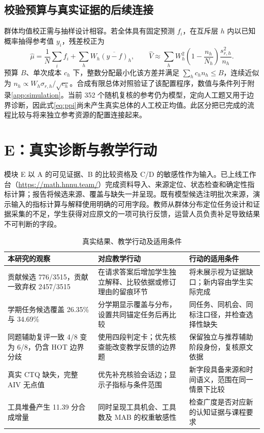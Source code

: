 \documentclass[withoutpreface,bwprint]{cumcmthesis}
\begin{document}
\subsection{校验预算与真实证据的后续连接}
群体均值校正需与抽样设计相容。若全体具有固定预测 $f_i$，在互斥层 $h$ 内以已知概率抽得参考值 $y_i$，残差校正为
\begin{equation}\label{eq:ppi}
\widehat\mu=\frac1N\sum_if_i+\sum_hW_h\overline{(y-f)}_h,\qquad
\widehat V\approx\sum_hW_h^2\left(1-\frac{n_h}{N_h}\right)\frac{s_{r,h}^2}{n_h}.
\end{equation}
预算 $B$、单次成本 $c_h$ 下，整数分配最小化该方差并满足 $\sum_hc_hn_h\le B$，连续近似为 $n_h\propto W_h\sigma_{r,h}/\sqrt{c_h}$。合成有限总体对照验证了该配置程序，数值与条件列于附录\ref{app:simulation}。当前 352 个随机复核的参考仍为模型，定向人工题又用于边界诊断，因此式\eqref{eq:ppi}尚未产生真实总体的人工校正均值。此区分把已完成的流程比较与将来独立参考资源的配置连接起来。

\section{E：真实诊断与教学行动}
模块 E 以 A 的可见证据、B 的比较资格及 C/D 的敏感性作为输入。已上线工作台（\url{https://math.hnnu.team/}）完成资料导入、来源定位、状态检查和确定性指标计算；报告将候选来源、覆盖与缺失一并呈现。既有模型候选注明批次来源，演示输入的指标计算与解释使用明确的可用字段。教师从群体分布定位任务设计和证据采集的不足，学生获得对应原文的一项可执行反馈，运营人员负责补足导致结果不可判断的字段。

\begin{table}[htbp]\centering\small
\caption{真实结果、教学行动及适用条件}\label{tab:decision}
\begin{tabularx}{\textwidth}{@{}p{}XX@{}}\toprule
本研究的观察 & 对应教学行动 & 行动的适用条件\\\midrule
贡献候选 776/3515，贡献一致弃权 2457/3515 & 在请求答案后增加学生独立解释、比较依据或修订理由的留痕环节 & 将未展示视为证据缺口；新内容由学生实际完成\\
学期任务候选覆盖 26.35\% 与 34.69\% & 分学期显示覆盖与分布，设置共同锚定任务后再比较 & 同任务、同机会、同标注口径，并检查选择性缺失\\
同题辅助复评一致 4/8 变为 6/8，仍含 HOT 边界分歧 & 使用四段判定卡；优先核查能改变教学反馈的边界题 & 保留独立与推荐辅助阶段身份，复核原文依据\\
真实 CTQ 缺失，完整 AIV 无点值 & 优先补充核验会话边；显示子指标与条件范围 & 新字段具备来源和时间语义，范围在同一情景下比较\\
工具堆叠产生 11.39 分合成增量 & 同时呈现工具机会、工具数及 MAB 的权重敏感性 & 检查广度是否对应新的认知证据与课程要求\\\bottomrule
\end{tabularx}
\end{table}
\end{document}
